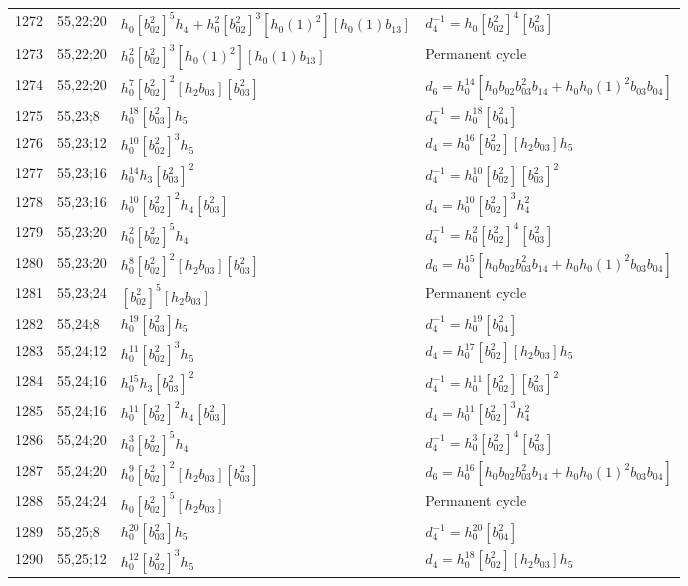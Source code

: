 \documentclass{article}
\begin{document}
\begin{longtable}{|l|l|>{\raggedright\arraybackslash}p{6cm}|>{\raggedright\arraybackslash}p{6cm}|}
\hline
1272 & 55,22;20 & $h_0[b_{02}^2]^5h_4 + h_0^2[b_{02}^2]^3[h_0(1)^2][h_0(1)b_{13}]$ & $d_{4}^{-1}=h_0[b_{02}^2]^4[b_{03}^2]$\\
1273 & 55,22;20 & $h_0^2[b_{02}^2]^3[h_0(1)^2][h_0(1)b_{13}]$ & Permanent cycle\\
1274 & 55,22;20 & $h_0^7[b_{02}^2]^2[h_2b_{03}][b_{03}^2]$ &$d_{6}=h_0^{14}[h_0b_{02}b_{03}^2b_{14} + h_0h_0(1)^2b_{03}b_{04}]$\\
\hline
1275 & 55,23;8 & $h_0^{18}[b_{03}^2]h_5$ & $d_{4}^{-1}=h_0^{18}[b_{04}^2]$\\
\hline
1276 & 55,23;12 & $h_0^{10}[b_{02}^2]^3h_5$ &$d_{4}=h_0^{16}[b_{02}^2][h_2b_{03}]h_5$\\
\hline
1277 & 55,23;16 & $h_0^{14}h_3[b_{03}^2]^2$ & $d_{4}^{-1}=h_0^{10}[b_{02}^2][b_{03}^2]^2$\\
1278 & 55,23;16 & $h_0^{10}[b_{02}^2]^2h_4[b_{03}^2]$ &$d_{4}=h_0^{10}[b_{02}^2]^3h_4^2$\\
\hline
1279 & 55,23;20 & $h_0^2[b_{02}^2]^5h_4$ & $d_{4}^{-1}=h_0^2[b_{02}^2]^4[b_{03}^2]$\\
1280 & 55,23;20 & $h_0^8[b_{02}^2]^2[h_2b_{03}][b_{03}^2]$ &$d_{6}=h_0^{15}[h_0b_{02}b_{03}^2b_{14} + h_0h_0(1)^2b_{03}b_{04}]$\\
\hline
1281 & 55,23;24 & $[b_{02}^2]^5[h_2b_{03}]$ & Permanent cycle\\
\hline
1282 & 55,24;8 & $h_0^{19}[b_{03}^2]h_5$ & $d_{4}^{-1}=h_0^{19}[b_{04}^2]$\\
\hline
1283 & 55,24;12 & $h_0^{11}[b_{02}^2]^3h_5$ &$d_{4}=h_0^{17}[b_{02}^2][h_2b_{03}]h_5$\\
\hline
1284 & 55,24;16 & $h_0^{15}h_3[b_{03}^2]^2$ & $d_{4}^{-1}=h_0^{11}[b_{02}^2][b_{03}^2]^2$\\
1285 & 55,24;16 & $h_0^{11}[b_{02}^2]^2h_4[b_{03}^2]$ &$d_{4}=h_0^{11}[b_{02}^2]^3h_4^2$\\
\hline
1286 & 55,24;20 & $h_0^3[b_{02}^2]^5h_4$ & $d_{4}^{-1}=h_0^3[b_{02}^2]^4[b_{03}^2]$\\
1287 & 55,24;20 & $h_0^9[b_{02}^2]^2[h_2b_{03}][b_{03}^2]$ &$d_{6}=h_0^{16}[h_0b_{02}b_{03}^2b_{14} + h_0h_0(1)^2b_{03}b_{04}]$\\
\hline
1288 & 55,24;24 & $h_0[b_{02}^2]^5[h_2b_{03}]$ & Permanent cycle\\
\hline
1289 & 55,25;8 & $h_0^{20}[b_{03}^2]h_5$ & $d_{4}^{-1}=h_0^{20}[b_{04}^2]$\\
\hline
1290 & 55,25;12 & $h_0^{12}[b_{02}^2]^3h_5$ &$d_{4}=h_0^{18}[b_{02}^2][h_2b_{03}]h_5$\\

\end{longtable}
\end{document}
